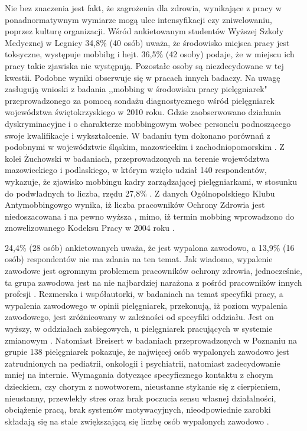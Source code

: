 \documentclass[a4paper,12pt,twoside,openright]{mwrep}
\begin{document}
Nie bez znaczenia jest fakt, że zagrożenia  dla zdrowia, wynikające z pracy w ponadnormatywnym wymiarze mogą ulec intensyfikacji czy zniwelowaniu, poprzez kulturę organizacji. Wśród ankietowanym studentów Wyższej Szkoły Medycznej w Legnicy 34,8\% (40 osób) uważa, że środowisko miejsca pracy jest toksyczne, występuje mobbibg i hejt. 36,5\% (42 osoby) podaje, że w miejscu ich pracy takie zjawiska nie występują. Pozostałe osoby są niezdecydowane w tej kwestii.  Podobne wyniki obserwuje się w pracach innych badaczy. Na uwagę zasługują wnioski z badania ,,mobbing w środowisku pracy pielęgniarek" przeprowadzonego za pomocą sondażu diagnostycznego wśród pielęgniarek województwa świętokrzyskiego w 2010 roku. Gdzie zaobserwowano działania dyskryminacyjne i o charakterze mobbingowym wobec personelu podnoszącego swoje kwalifikacje i wykształcenie. W badaniu tym dokonano porównań z podobnymi w województwie śląskim, mazowieckim i zachodniopomorskim \cite{mobbing}. Z kolei Żuchowski w badaniach, przeprowadzonych na terenie województwa mazowieckiego i podlaskiego, w którym wzięło udział 140 respondentów, wykazuje, że zjawisko mobbingu kadry zarządzającej pielęgniarkami, w stosunku do podwładnych to liczba, rzędu 27,8\% \cite{zuchowski}. Z danych Ogólnopolskiego Klubu Antymobbingowgo wynika, iż liczba pracowników Ochrony Zdrowia jest niedoszacowana i na pewno wyższa \cite{grabowski}, mimo, iż termin mobbing wprowadzono do znowelizowanego Kodeksu Pracy w 2004 roku \cite{kodeks}.





24,4\% (28 osób) ankietowanych uważa, że jest wypalona zawodowo, a 13,9\% (16 osób) respondentów nie ma zdania na ten temat. Jak wiadomo, wypalenie zawodowe jest ogromnym problemem pracowników ochrony zdrowia, jednocześnie, ta grupa zawodowa jest na nie najbardziej narażona z pośród pracowników innych profesji \cite{wypal}. Rezmerska i współautorki, w badaniach na temat specyfiki pracy, a wypalenia zawodowego w opinii pielęgniarek,  przekonują, iż poziom wypalenia zawodowego, jest zróżnicowany w zależności od specyfiki oddziału. Jest on wyższy, w oddziałach zabiegowych, u pielęgniarek pracujących w systemie zmianowym \cite{zmiany}. Natomiast Breisert w badaniach przeprowadzonych w Poznaniu na grupie 138 pielęgniarek pokazuje, że najwięcej osób wypalonych zawodowo jest zatrudnionych na pediatrii, onkologii i psychiatrii, natomiast zadecydowanie mniej na internie. Wymagania dotyczące specyficznego kontaktu z chorym dzieckiem, czy chorym z nowotworem, nieustanne stykanie się z cierpieniem, nieustanny, przewlekły stres oraz brak poczucia sensu własnej działalności, obciążenie pracą, brak systemów motywacyjnych, nieodpowiednie zarobki składają się na stale zwiększającą się liczbę osób wypalonych zawodowo \cite{breisert}.
\end{document}
